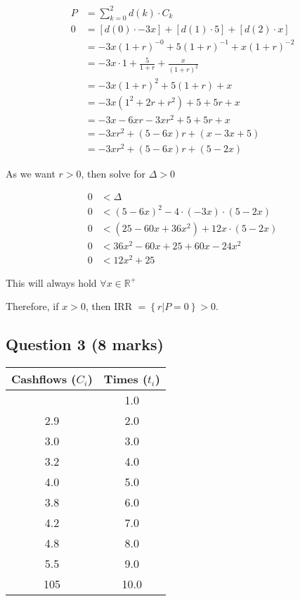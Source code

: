 \documentclass[11pt]{article}
\begin{document}
    \begin{align}
    P &= \sum_{k=0}^{2} d(k) \cdot C_k \\
    0 &= \left[d(0) \cdot -3x\right] + \left[d(1) \cdot 5\right] + \left[d(2) \cdot x\right] \\
    &= -3x (1 + r)^{-0} + 5 (1 + r)^{-1} + x (1 + r)^{-2} \\
    &= -3x \cdot 1 + \frac{5}{1 + r} + \frac{x}{(1 + r)^2} \\
    &= -3x (1 + r)^2 + 5 (1 + r) + x \\
    &= -3x (1^2 + 2r + r^2) + 5 + 5r + x \\
    &= -3x - 6xr - 3xr^2 + 5 + 5r + x \\
    &= -3xr^2 + (5 - 6x)r + (x - 3x + 5) \\
    &= -3xr^2 + (5 - 6x)r + (5 - 2x)
\end{align}

As we want \(r > 0\), then solve for \(\Delta > 0\)

\begin{align}
    0 &< \Delta \\
    0 &< (5 - 6x)^2 - 4 \cdot (-3x) \cdot (5 - 2x) \\
    0 &< (25 - 60x + 36x^2) + 12x \cdot (5 - 2x) \\
    0 &< 36x^2 - 60x + 25 + 60x - 24x^2 \\
    0 &< 12x^2 + 25
\end{align}

This will always hold \(\forall x \in \mathbb{R}^+\)

Therefore, if \(x > 0\), then IRR \(= \left\{r | P = 0\right\} > 0\).

    \subsection{Question 3 (8 marks)}\label{question-3-8-marks}

\begin{longtable}[]{@{}cc@{}}
\toprule\noalign{}
Cashflows (\(C_i\)) & Times (\(t_i\)) \\
\midrule\noalign{}
\endhead
\bottomrule\noalign{}
\endlastfoot
2.3 & 1.0 \\
2.9 & 2.0 \\
3.0 & 3.0 \\
3.2 & 4.0 \\
4.0 & 5.0 \\
3.8 & 6.0 \\
4.2 & 7.0 \\
4.8 & 8.0 \\
5.5 & 9.0 \\
105 & 10.0 \\
\end{longtable}
\end{document}
